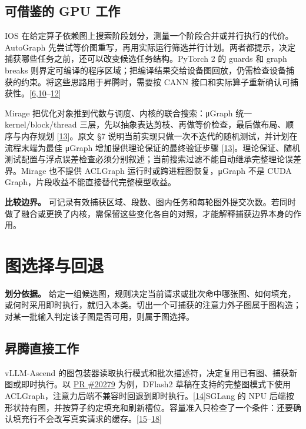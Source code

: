 \documentclass[
  UTF8,
  zihao=5]{ctexart}
\begin{document}
\hypertarget{ux53efux501fux9274ux7684-gpu-ux5de5ux4f5c}{%
\subsection{可借鉴的 GPU
工作}\label{ux53efux501fux9274ux7684-gpu-ux5de5ux4f5c}}

IOS
在给定算子依赖图上搜索阶段划分，测量一个阶段合并或并行执行的代价。AutoGraph
先尝试等价图重写，再用实际运行筛选并行计划。两者都提示，决定捕获哪些任务之前，还可以改变候选任务结构。PyTorch
2 的 guards 和 graph breaks
则界定可编译的程序区域；把编译结果交给设备图回放，仍需检查设备捕获的约束。将这些思路用于昇腾时，需要按
CANN
接口和实际算子重新确认可捕获性。{[}\protect\hyperlink{ref-cann910single}{6},\protect\hyperlink{ref-ding2021ios}{10}--\protect\hyperlink{ref-ansel2024pytorch2}{12}{]}

Mirage 把优化对象推到代数与调度、内核的联合搜索：μGraph 统一
kernel/block/thread
三层，先以抽象表达剪枝、再做等价检查，最后做布局、顺序与内存规划
{[}\protect\hyperlink{ref-wu2025mirage}{13}{]}。原文 §7
说明当前实现只做一次不迭代的随机测试，并计划在流程末端为最佳 μGraph
增加提供理论保证的最终验证步骤
{[}\protect\hyperlink{ref-wu2025mirage}{13}{]}。理论保证、随机测试配置与浮点误差检查必须分别叙述；当前搜索过滤不能自动继承完整理论误差界。Mirage
也不提供 ACLGraph 运行时或跨进程图恢复，μGraph 不是 CUDA
Graph，片段收益不能直接替代完整模型收益。

\textbf{比较边界。}
可记录有效捕获区域、段数、图内任务和每轮图外提交次数。若同时做了融合或更换了内核，需保留这些变化各自的对照，才能解释捕获边界本身的作用。

\hypertarget{selection}{%
\section{图选择与回退}\label{selection}}

\textbf{划分依据。}
给定一组候选图，规则决定当前请求或批次命中哪张图、如何填充，或何时采用即时执行，就归入本类。切出一个可捕获的注意力外子图属于图构造；对某一批输入判定该子图是否可用，则属于图选择。

\hypertarget{ux6607ux817eux76f4ux63a5ux5de5ux4f5c-1}{%
\subsection{昇腾直接工作}\label{ux6607ux817eux76f4ux63a5ux5de5ux4f5c-1}}

vLLM-Ascend
的图包装器读取执行模式和批次描述符，决定复用已有图、捕获新图或即时执行。以
\href{https://github.com/vllm-project/vllm-ascend/pull/20279}{PR
\#20279} 为例，DFlash2 草稿在支持的完整图模式下使用
ACLGraph，注意力后端不兼容时回退到即时执行。{[}\protect\hyperlink{ref-ascend20279}{14}{]}SGLang
的 NPU
后端按形状持有图，并按算子约定填充和刷新槽位。容量准入只检查了一个条件：还要确认填充行不会改写真实请求的缓存。{[}\protect\hyperlink{ref-vllmascenddesign}{15}--\protect\hyperlink{ref-sglang2026impl}{18}{]}
\end{document}
